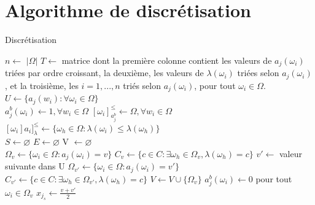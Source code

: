 \documentclass[a4paper]{article}
\begin{document}
\section{Algorithme de discrétisation}
\label{appendix:discretize}

\begin{algorithm}[H]
\caption{Discrétisation}
\begin{algorithmic}
\State {}
\State {}
\State {}

\State $n\gets$ $| \Omega |$ 
\State $T \gets $ matrice dont la première colonne contient les valeurs de $a_j(\omega_i)$ triées par ordre croissant, la deuxième, les valeurs de $\lambda(\omega_i)$ triées selon $a_j(\omega_i)$, et la troisième, les $i=1,...,n$ triés selon $a_j(\omega_i)$, pour tout $\omega_i \in \Omega$.
\State $U\gets \{a_j(w_i) : \forall \omega_i \in \Omega\}$  \\

\State $a^{b}_j(\omega_i) \gets 1, \forall w_i \in \Omega$ 
\State $[\omega_i]^{\leq}_{a^{b}_j} \gets \Omega, \forall w_i \in \Omega$ 
\State $[\omega_i]a_i]^{\leq}_{\lambda} \gets \{\omega_h \in \Omega : \lambda(\omega_i) \leq \lambda(\omega_h)\}$ \\

\State $S \gets \varnothing $ 
\State $E \gets \varnothing $ 
\State V $\gets \varnothing $  \\

 
    \State $\Omega_{v} \gets \{\omega_i \in \Omega : a_j(\omega_i) = v\}$
    \State $C_{v} \gets \{c \in C : \exists \omega_h \in \Omega_{v}, \lambda(\omega_h) = c\}$
    \State $v' \gets$ valeur suivante dans U
    \State $\Omega_{v'} \gets \{\omega_i \in \Omega : a_j(\omega_i) = v'\}$
    \State $C_{v'} \gets \{c \in C : \exists \omega_h \in \Omega_{v'}, \lambda(\omega_h) = c\}$
    \State $V \gets V \cup \{\Omega_{v}\}$    
    \State $a^{b}_j(\omega_i) \gets 0$ pour tout $\omega_i \in \Omega_{v}$ 
    \State $x_{j_s}\gets \frac{v + v'}{2}$\\
    

\end{algorithmic}
\end{algorithm}
\end{document}
